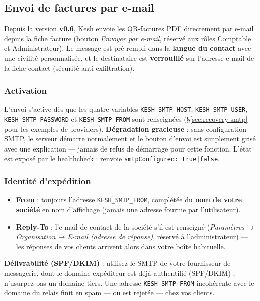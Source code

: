 \documentclass[a4paper,11pt,oneside]{article}
\begin{document}
\subsection{Envoi de factures par e-mail}\label{sec:invoice-email}

Depuis la version \textbf{v0.6}, Kesh envoie les QR-factures PDF directement
par e-mail depuis la fiche facture (bouton \emph{Envoyer par e-mail},
r\'eserv\'e aux r\^oles Comptable et Administrateur). Le message est
pr\'e-rempli dans la \textbf{langue du contact} avec une civilit\'e
personnalis\'ee, et le destinataire est \textbf{verrouill\'e} sur l'adresse
e-mail de la fiche contact (s\'ecurit\'e anti-exfiltration).

\subsubsection{Activation}

L'envoi s'active d\`es que les quatre variables \texttt{KESH\_SMTP\_HOST},
\texttt{KESH\_SMTP\_USER}, \texttt{KESH\_SMTP\_PASSWORD} et
\texttt{KESH\_SMTP\_FROM} sont renseign\'ees (\S\ref{sec:recovery-smtp}
pour les exemples de providers). \textbf{D\'egradation gracieuse} : sans
configuration SMTP, le serveur d\'emarre normalement et le bouton d'envoi
est simplement gris\'e avec une explication — jamais de refus de d\'emarrage
pour cette fonction. L'\'etat est expos\'e par le healthcheck :
 renvoie \texttt{smtpConfigured: true|false}.

\subsubsection{Identit\'e d'exp\'edition}

\begin{itemize}
    \item \textbf{From} : toujours l'adresse \texttt{KESH\_SMTP\_FROM},
          compl\'et\'ee du \textbf{nom de votre soci\'et\'e} en nom
          d'affichage (jamais une adresse fournie par l'utilisateur).
    \item \textbf{Reply-To} : l'e-mail de contact de la soci\'et\'e s'il est
          renseign\'e (\emph{Param\`etres → Organisation → E-mail (adresse de
          r\'eponse)}, r\'eserv\'e \`a l'administrateur) — les r\'eponses de
          vos clients arrivent alors dans votre bo\^ite habituelle.
\end{itemize}

\begin{keshwarning}
\textbf{D\'elivrabilit\'e (SPF/DKIM)} : utilisez le SMTP de votre
fournisseur de messagerie, dont le domaine exp\'editeur est d\'ej\`a
authentifi\'e (SPF/DKIM) ; n'usurpez pas un domaine tiers. Une adresse
\texttt{KESH\_SMTP\_FROM} incoh\'erente avec le domaine du relais finit en
spam — ou est rejet\'ee — chez vos clients.
\end{keshwarning}
\end{document}
